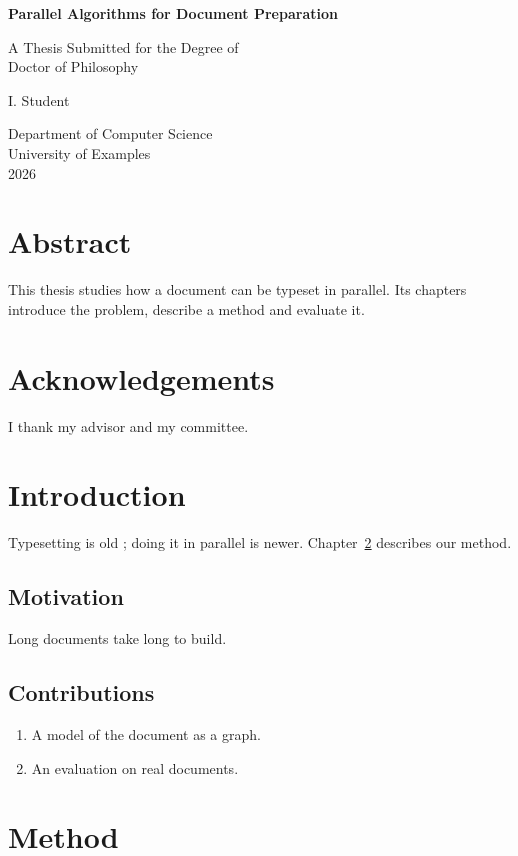 \documentclass[11pt,a4paper,oneside,openany]{memoir}
\begin{document}
\frontmatter
\begin{titlingpage}
\centering
\vspace*{3cm}
{\HUGE\bfseries Parallel Algorithms for Document Preparation\par}
\vspace{2cm}
{\Large A Thesis Submitted for the Degree of\\ Doctor of Philosophy\par}
\vspace{2cm}
{\Large I. Student\par}
\vfill
{\large Department of Computer Science\\ University of Examples\\ 2026\par}
\end{titlingpage}
\chapter*{Abstract}
This thesis studies how a document can be typeset in parallel. Its
chapters introduce the problem, describe a method and evaluate it.
\chapter*{Acknowledgements}
I thank my advisor and my committee.
\tableofcontents*
\listoffigures*
\listoftables*
\mainmatter
\chapter{Introduction}\label{ch:intro}
Typesetting is old \cite{knuth1984,lamport1994}; doing
it in parallel is newer. Chapter~\ref{ch:method}
describes our method.
\section{Motivation}
Long documents take long to build.
\section{Contributions}
\begin{enumerate}
\item A model of the document as a graph.
\item An evaluation on real documents.
\end{enumerate}
\chapter{Method}\label{ch:method}
\end{document}
